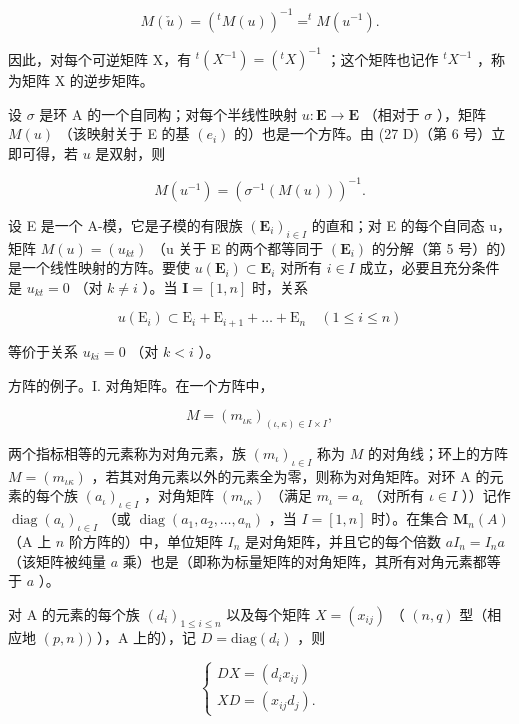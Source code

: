 \[
M (\check {u}) = (^ {t} M (u)) ^ {- 1} = ^ {t} M (u ^ {- 1}).\tag{29}
\]

因此，对每个可逆矩阵 X，有 \({}^{t}(X^{-1}) = ({}^{t}X)^{-1}\) ；这个矩阵也记作 \({}^{t}X^{-1}\) ，称为矩阵 X 的逆步矩阵。

设 \(\sigma\) 是环 A 的一个自同构；对每个半线性映射 \(u: \mathbf{E} \to \mathbf{E}\) （相对于 \(\sigma\) ），矩阵 \(M(u)\) （该映射关于 E 的基 \((e_i)\) 的）也是一个方阵。由 (27 D)（第 6 号）立即可得，若 \(u\) 是双射，则

\[
M (u ^ {- 1}) = (\sigma^ {- 1} (M (u))) ^ {- 1}.
\]

设 E 是一个 A-模，它是子模的有限族 \((\mathbf{E}_{i})_{i\in I}\) 的直和；对 E 的每个自同态 u，矩阵 \(M(u)=(u_{kt})\) （u 关于 E 的两个都等同于 \((\mathbf{E}_{i})\) 的分解（第 5 号）的）是一个线性映射的方阵。要使 \(u(\mathbf{E}_{i})\subset\mathbf{E}_{i}\) 对所有 \(i\in I\) 成立，必要且充分条件是 \(u_{kt}=0\) （对 \(k\neq i\) ）。当 \(\mathbf{I} = [1, n]\) 时，关系

\[
u (\mathrm{E} _ {i}) \subset \mathrm{E} _ {i} + \mathrm{E} _ {i + 1} + \dots + \mathrm{E} _ {n} \quad (1 \leqslant i \leqslant n)
\]

等价于关系 \(u_{ki} = 0\) （对 \(k < i\) ）。

方阵的例子。I. 对角矩阵。在一个方阵中，

\[
M = \left(m _ {\iota \kappa}\right) _ {(\iota, \kappa) \in I \times I},
\]

两个指标相等的元素称为对角元素，族 \((m_{\iota})_{\iota \in I}\) 称为 \(M\) 的对角线；环上的方阵 \(M = (m_{\iota \kappa})\) ，若其对角元素以外的元素全为零，则称为对角矩阵。对环 A 的元素的每个族 \((a_{\iota})_{\iota \in I}\) ，对角矩阵 \((m_{\iota \kappa})\) （满足 \(m_{\iota} = a_{\iota}\) （对所有 \(\iota \in I\) ））记作 \(\operatorname{diag}(a_{\iota})_{\iota \in I}\) （或 \(\operatorname{diag}(a_1, a_2, \ldots, a_n)\) ，当 \(I = [1, n]\) 时）。在集合 \(\mathbf{M}_n(A)\) （A 上 \(n\) 阶方阵的）中，单位矩阵 \(I_n\) 是对角矩阵，并且它的每个倍数 \(aI_n = I_na\) （该矩阵被纯量 \(a\) 乘）也是（即称为标量矩阵的对角矩阵，其所有对角元素都等于 \(a\) ）。

对 A 的元素的每个族 \((d_i)_{1\leqslant i\leqslant n}\) 以及每个矩阵 \(X = (x_{ij})\) （ \((n,q)\) 型（相应地 \((p,n))\) ），A 上的），记 \(D = \mathrm{diag}(d_i)\) ，则

\[
\left\{ \begin{array}{l} D X = (d _ {i} x _ {i j}) \\ X D = (x _ {i j} d _ {j}). \end{array} \right.\tag{30}
\]

